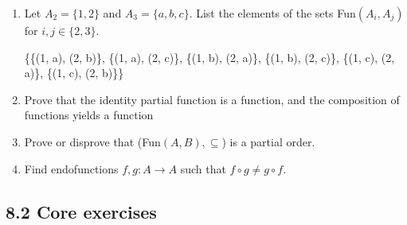 \documentclass[10pt,\jkfside,a4paper]{article}
\begin{document}
\begin{enumerate}

\item Let $A_2 = \{1, 2\}$ and $A_3 = \{a, b, c\}$. List the elements of the sets 
Fun$(A_i, A_j)$ for $i, j \in \{2, 3\}$.

\{\{(1, a), (2, b)\}, \{(1, a), (2, c)\}, \{(1, b), (2, a)\}, \{(1, b), (2, c)\}, \{(1, c), (2, a)\}, \{(1, c), (2, b)\}\}

\item Prove that the identity partial function is a function, and the composition of functions 
yields a function



\item Prove or disprove that (Fun$(A, B), \subseteq$) is a partial order.



\item Find endofunctions $f, g: A \rightarrow A$ such that $f \circ g \neq g \circ f$.



\end{enumerate}

\subsection*{8.2 Core exercises}
\end{document}
